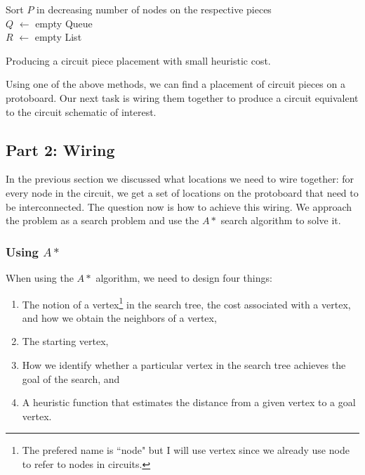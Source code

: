 \begin{algorithm}
\BlankLine
Sort $P$ in decreasing number of nodes on the respective pieces\\
$Q$ $\leftarrow$ empty Queue\\
$R$ $\leftarrow$ empty List\\
\caption{Producing a circuit piece placement with small heuristic cost.}
\label{alg:small_cost_placement}
\end{algorithm}

Using one of the above methods, we can find a placement of circuit pieces on a
protoboard. Our next task is wiring them together to produce a circuit
equivalent to the circuit schematic of interest.

\subsection{Part 2: Wiring}

In the previous section we discussed what locations we need to wire together:
for every node in the circuit, we get a set of locations on the protoboard that
need to be interconnected. The question now is how to achieve this wiring. We
approach the problem as a search problem and use the $A*$ search algorithm to
solve it.

\subsubsection{Using $A*$}

When using the $A*$ algorithm, we need to design four things:

\begin{enumerate}
\item The notion of a vertex\footnote{The prefered name is ``node" but I will
use vertex since we already use node to refer to nodes in circuits.} in the
search tree, the cost associated with a vertex, and how we obtain the neighbors
of a vertex,
\item The starting vertex,
\item How we identify whether a particular vertex in the search tree achieves
the goal of the search, and
\item A heuristic function that estimates the distance from a given vertex to a
goal vertex.
\end{enumerate}


